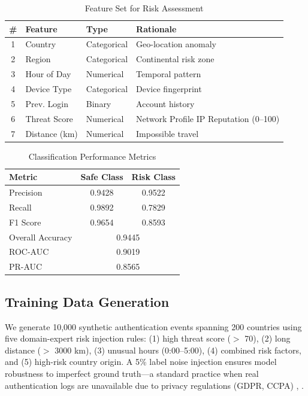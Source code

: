 \documentclass[conference]{IEEEtran}
\begin{document}
\begin{table}[t]
\caption{Feature Set for Risk Assessment}
\label{tab:features}
\centering
\begin{tabular}{@{}clll@{}}
\toprule
\# & Feature & Type & Rationale \\
\midrule
1 & Country & Categorical & Geo-location anomaly \\
2 & Region & Categorical & Continental risk zone \\
3 & Hour of Day & Numerical & Temporal pattern \\
4 & Device Type & Categorical & Device fingerprint \\
5 & Prev. Login & Binary & Account history \\
6 & Threat Score & Numerical & Network Profile IP Reputation (0--100) \\
7 & Distance (km) & Numerical & Impossible travel \\
\bottomrule
\end{tabular}
\end{table}

\begin{table}[t]
\caption{Classification Performance Metrics}
\label{tab:perf}
\centering
\begin{tabular}{@{}lcc@{}}
\toprule
Metric & Safe Class & Risk Class \\
\midrule
Precision & 0.9428 & 0.9522 \\
Recall & 0.9892 & 0.7829 \\
F1 Score & 0.9654 & 0.8593 \\
\midrule
Overall Accuracy & \multicolumn{2}{c}{0.9445} \\
ROC-AUC & \multicolumn{2}{c}{0.9019} \\
PR-AUC & \multicolumn{2}{c}{0.8565} \\
\bottomrule
\end{tabular}
\end{table}

\subsection{Training Data Generation}
We generate 10,000 synthetic authentication events spanning 200 countries using five domain-expert risk injection rules: (1) high threat score ($>$ 70), (2) long distance ($>$ 3000 km), (3) unusual hours (0:00--5:00), (4) combined risk factors, and (5) high-risk country origin. A 5\% label noise injection ensures model robustness to imperfect ground truth---a standard practice when real authentication logs are unavailable due to privacy regulations (GDPR, CCPA) \cite{freeman2016}, \cite{wiefling2019}.
\end{document}
